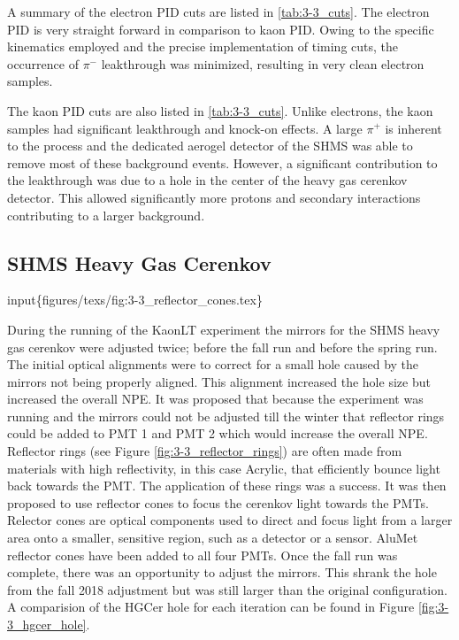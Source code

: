 \documentclass[
]{report}
\begin{document}




A summary of the electron PID cuts are listed in \ref{tab:3-3_cuts}. The
electron PID is very straight forward in comparison to kaon PID. Owing
to the specific kinematics employed and the precise implementation of
timing cuts, the occurrence of \(\pi^-\) leakthrough was minimized,
resulting in very clean electron samples.



The kaon PID cuts are also listed in \ref{tab:3-3_cuts}. Unlike
electrons, the kaon samples had significant leakthrough and knock-on
effects. A large \(\pi^+\) is inherent to the process and the dedicated
aerogel detector of the SHMS was able to remove most of these background
events. However, a significant contribution to the leakthrough was due
to a hole in the center of the heavy gas cerenkov detector. This allowed
significantly more protons and secondary interactions contributing to a
larger background.

\hypertarget{shms-heavy-gas-cerenkov}{%
\subsection{SHMS Heavy Gas Cerenkov}\label{shms-heavy-gas-cerenkov}}



input\{figures/texs/fig:3-3\_reflector\_cones.tex\}

During the running of the KaonLT experiment the mirrors for the SHMS
heavy gas cerenkov were adjusted twice; before the fall run and before
the spring run. The initial optical alignments were to correct for a
small hole caused by the mirrors not being properly aligned. This
alignment increased the hole size but increased the overall NPE. It was
proposed that because the experiment was running and the mirrors could
not be adjusted till the winter that reflector rings could be added to
PMT 1 and PMT 2 which would increase the overall NPE. Reflector rings
(see Figure \ref{fig:3-3_reflector_rings}) are often made from materials
with high reflectivity, in this case Acrylic, that efficiently bounce
light back towards the PMT. The application of these rings was a
success. It was then proposed to use reflector cones to focus the
cerenkov light towards the PMTs. Relector cones are optical components
used to direct and focus light from a larger area onto a smaller,
sensitive region, such as a detector or a sensor. AluMet reflector cones
have been added to all four PMTs. Once the fall run was complete, there
was an opportunity to adjust the mirrors. This shrank the hole from the
fall 2018 adjustment but was still larger than the original
configuration. A comparision of the HGCer hole for each iteration can be
found in Figure \ref{fig:3-3_hgcer_hole}.
\end{document}
